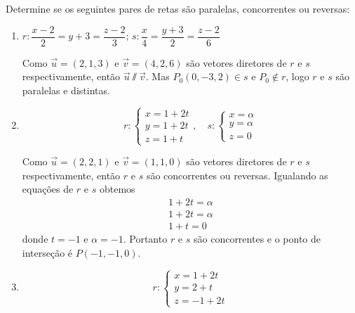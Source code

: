 \begin{exemplos}
    Determine se os seguintes pares de retas são paralelas, concorrentes ou reversas:
    \begin{enumerate}
        \item $r: \dfrac{x - 2}{2} = y + 3 = \dfrac{z - 2}{3}$; $s:\dfrac{x}{4} = \dfrac{y+3}{2} = \dfrac{z-2}{6}$
              \begin{solucao}
                  Como $\vec{u} = (2,1,3)$ e $\vec{v} = (4,2,6)$ são vetores diretores de $r$ e $s$ respectivamente, então $\vec{u}\varparallel\vec{v}$. Mas $P_0(0,-3,2)\in s$ e $P_0\notin r$, logo $r$ e $s$ são paralelas e distintas.
              \end{solucao}
        \item
              \[
                  r: \begin{cases}
                      x = 1 + 2t \\
                      y = 1 + 2t \\
                      z = 1 + t
                  \end{cases},\quad s: \begin{cases}
                      x = \alpha \\
                      y = \alpha \\
                      z = 0
                  \end{cases}
              \]
              \begin{solucao}
                  Como $\vec{u} = (2,2,1)$ e $\vec{v} = (1,1,0)$ são vetores diretores de $r$ e $s$ respectivamente, então $r$ e $s$ são concorrentes ou reversas. Igualando as equações de $r$ e $s$ obtemos
                  \begin{align*}
                      1 + 2t = \alpha \\
                      1 + 2t = \alpha \\
                      1 + t = 0
                  \end{align*}
                  donde $t = -1$ e $\alpha = -1$. Portanto $r$ e $s$ são concorrentes e o ponto de interseção é $P(-1,-1,0)$.
              \end{solucao}
        \item
              \[
                  r: \begin{cases}
                      x = 1 + 2t \\
                      y = 2 + t  \\
                      z = -1 + 2t

\end{cases}\]
\end{enumerate}
\end{exemplos}
